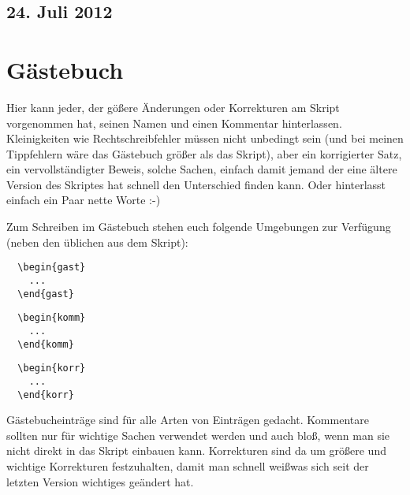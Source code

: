 \documentclass[paper = A4, fontsize=12pt, numbers=noendperiod, chapterprefix=true]{scrbook}
\theoremstyle{break}
\theoremstyle{nonumberbreak}
\newtheorem{gast}{G\"astebucheintrag}
\newtheorem{komm}{Kommentar}
\newtheorem{korr}{Korrktur}
\theoremstyle{nonumberplain}
\begin{document}
\newpage
\section{24. Juli 2012}
\setcounter{Aufg}{0}
\setcounter{Loes}{0}




\def\indexspace{\par\medskip}





\chapter{G\"astebuch}
Hier kann jeder, der g\"o\ss ere \"Anderungen oder Korrekturen am Skript vorgenommen hat, seinen Namen und einen Kommentar hinterlassen. Kleinigkeiten wie Rechtschreibfehler m\"ussen nicht unbedingt sein (und bei meinen Tippfehlern w\"are das G\"astebuch gr\"o\ss er als das Skript), aber ein korrigierter Satz, ein vervollst\"andigter Beweis, solche Sachen, einfach damit jemand der eine \"altere Version des Skriptes hat schnell den Unterschied finden kann. Oder hinterlasst einfach ein Paar nette Worte :-)

Zum Schreiben im G\"astebuch stehen euch folgende Umgebungen zur Verf\"ugung (neben den \"ublichen aus dem Skript):
\begin{center}\begin{minipage}{0.3\textwidth}\begin{verbatim}
  \begin{gast}
    ...
  \end{gast}
\end{verbatim}\end{minipage}
\begin{minipage}{0.3\textwidth}\begin{verbatim}  
  \begin{komm}
    ...  
  \end{komm}
\end{verbatim}\end{minipage}
\begin{minipage}{0.3\textwidth}\begin{verbatim}  
  \begin{korr}
    ...  
  \end{korr}
\end{verbatim}\end{minipage}\end{center}
G\"astebucheintr\"age sind f\"ur alle Arten von Eintr\"agen gedacht. Kommentare sollten nur f\"ur wichtige Sachen verwendet werden und auch blo\ss,  wenn man sie nicht direkt in das Skript einbauen kann. Korrekturen sind da um gr\"o\ss ere und wichtige Korrekturen festzuhalten, damit man schnell wei\ss was sich seit der letzten Version wichtiges ge\"andert hat.
\end{document}
